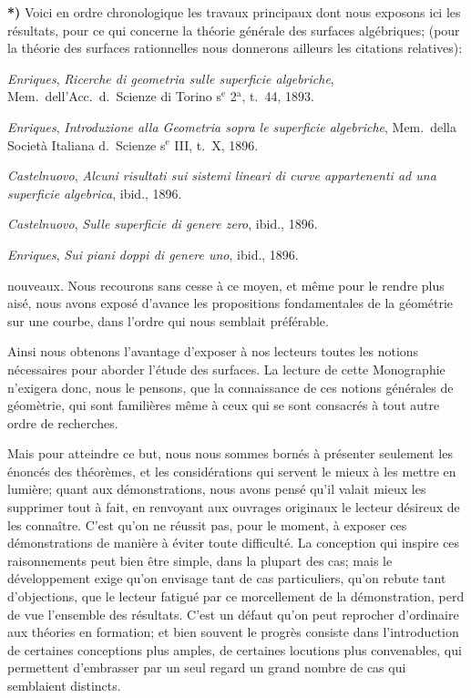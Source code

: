 \documentclass{article}
\begin{document}
\textbf{*)} Voici en ordre chronologique les travaux principaux dont nous exposons ici les résultats, pour ce qui concerne la théorie générale des surfaces algébriques; (pour la théorie des surfaces rationnelles nous donnerons ailleurs les citations relatives):

\emph{Enriques}, \emph{Ricerche di geometria sulle superficie algebriche}, Mem.\ dell'Acc.\ d.\ Scienze di Torino s${}^{\text{e}}$ 2${}^{\text{a}}$, t.\ 44, 1893.

\emph{Enriques}, \emph{Introduzione alla Geometria sopra le superficie algebriche}, Mem.\ della Società Italiana d.\ Scienze s${}^{\text{e}}$ III, t.\ X, 1896.

\emph{Castelnuovo}, \emph{Alcuni risultati sui sistemi lineari di curve appartenenti ad una superficie algebrica}, ibid., 1896.

\emph{Castelnuovo}, \emph{Sulle superficie di genere zero}, ibid., 1896.

\emph{Enriques}, \emph{Sui piani doppi di genere uno}, ibid., 1896.

nouveaux. Nous recourons sans cesse à ce moyen, et même pour le rendre plus aisé, nous avons exposé d'avance les propositions fondamentales de la géométrie sur une courbe, dans l'ordre qui nous semblait préférable.

Ainsi nous obtenons l'avantage d'exposer à nos lecteurs toutes les notions nécessaires pour aborder l'étude des surfaces. La lecture de cette Monographie n'exigera donc, nous le pensons, que la connaissance de ces notions générales de géomètrie, qui sont familières même à ceux qui se sont consacrés à tout autre ordre de recherches.

Mais pour atteindre ce but, nous nous sommes bornés à présenter seulement les énoncés des théorèmes, et les considérations qui servent le mieux à les mettre en lumière; quant aux démonstrations, nous avons pensé qu'il valait mieux les supprimer tout à fait, en renvoyant aux ouvrages originaux le lecteur désireux de les connaître. C'est qu'on ne réussit pas, pour le moment, à exposer ces démonstrations de manière à éviter toute difficulté. La conception qui inspire ces raisonnements peut bien être simple, dans la plupart des cas; mais le développement exige qu'on envisage tant de cas particuliers, qu'on rebute tant d'objections, que le lecteur fatigué par ce morcellement de la démonstration, perd de vue l'ensemble des résultats. C'est un défaut qu'on peut reprocher d'ordinaire aux théories en formation; et bien souvent le progrès consiste dans l'introduction de certaines conceptions plus amples, de certaines locutions plus convenables, qui permettent d'embrasser par un seul regard un grand nombre de cas qui semblaient distincts.
\end{document}
